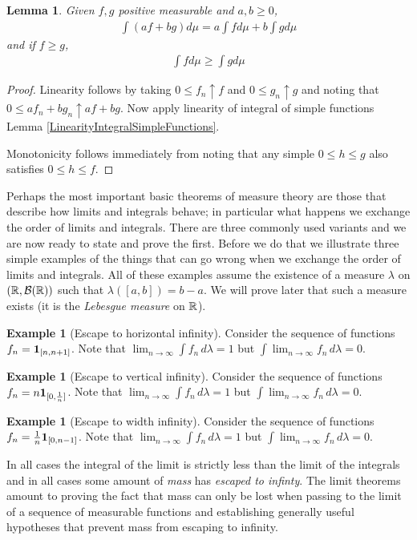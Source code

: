 \documentclass{amsart}
\newtheorem{lem}[thm]{Lemma}
\theoremstyle{remark}
\theoremstyle{definition}
\newtheorem{examp}[thm]{Example}
\begin{document}
\begin{lem}Given $f,g$ positive measurable and $a,b \geq 0$, 
\begin{align*}
\int \left ( a f + b g \right ) d \mu = a \int f d \mu + b \int g d \mu
\end{align*}
and if $f \geq g$,
\begin{align*}
\int f  d \mu \geq \int g d \mu
\end{align*}
\end{lem}
\begin{proof}Linearity follows by taking $0 \leq f_n \uparrow f$ and
  $0 \leq g_n \uparrow g$ and noting that $0 \leq a f_n + b g_n
  \uparrow a f + b g$.  Now apply linearity of integral of simple
  functions Lemma \ref{LinearityIntegralSimpleFunctions}.

Monotonicity follows immediately from noting that any simple $0 \leq h
\leq g$ also satisfies $0 \leq h \leq f$.
\end{proof}
Perhaps the most important basic theorems of measure theory are those
that describe how limits and integrals behave; in particular what
happens we exchange the order of limits and integrals.  There are three
commonly used variants and we are now ready to state and prove the
first.  Before we do that we illustrate three simple examples of the
things that can go wrong when we exchange the order of limits and
integrals.  All of these examples assume the existence of a measure
$\lambda$ on
$(\mathbb{R},\mathcal{B}(\mathbb{R}))$ such that $\lambda([a,b]) = b -a$.  We
will prove later that such a measure exists (it is the \emph{Lebesgue
  measure} on $\mathbb{R}$).
\begin{examp}[Escape to horizontal infinity]Consider the sequence of functions 
$f_n = \textbf{1}_{[n,n+1]}$.  Note that $\lim_{n \to \infty}
\int f_n \, d \lambda = 1$ but $\int \lim_{n \to \infty}  f_n \, d
\lambda = 0$.
\end{examp}
\begin{examp}[Escape to vertical infinity]Consider the sequence of functions 
$f_n = n \textbf{1}_{[0,\frac{1}{n}]}$.  Note that $\lim_{n \to \infty}
\int f_n \, d \lambda = 1$ but $\int \lim_{n \to \infty}  f_n \, d
\lambda = 0$.
\end{examp}
\begin{examp}[Escape to width infinity]Consider the sequence of functions 
$f_n = \frac{1}{n}\textbf{1}_{[0,n-1]}$.  Note that $\lim_{n \to \infty}
\int f_n \, d \lambda = 1$ but $\int \lim_{n \to \infty}  f_n \, d
\lambda = 0$.
\end{examp}
 In all cases the integral of the limit is strictly less than the limit
of the integrals and in all cases some amount of \emph{mass} has
\emph{escaped to infinty}.  The limit theorems amount to proving the
fact that mass can only be lost when passing to the limit of a
sequence of measurable functions and establishing generally useful
hypotheses that prevent mass from escaping to infinity.
\end{document}

